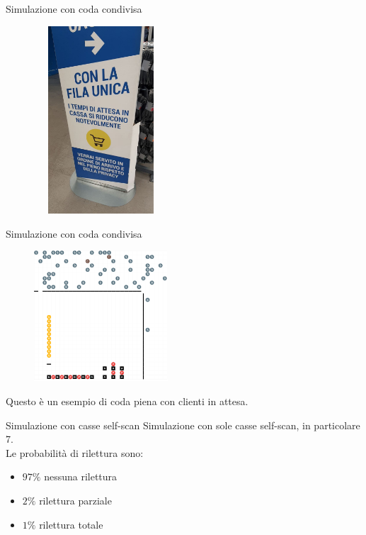 \begin{frame}{Simulazione con coda condivisa}
	\begin{figure}[H]
		\centering
		\includegraphics[width=5cm, height=7cm]{"../report/images/decathlon.jpg"}
	\end{figure}
\end{frame}

\begin{frame}{Simulazione con coda condivisa}
	\begin{figure}[H]
		\centering
		\includegraphics[width=5cm]{"../report/images/results/codacondivisa_screenshot.png"}
	\end{figure}
	Questo è un esempio di coda piena con clienti in attesa.
\end{frame}

\begin{frame}{Simulazione con casse self-scan}
	Simulazione con sole casse self-scan, in particolare 7. \\
	Le probabilità di rilettura sono:
	\begin{itemize}
		\item $97 \%$ nessuna rilettura
		\item $2 \%$ rilettura parziale
		\item $1 \%$ rilettura totale
	\end{itemize}
\end{frame}

